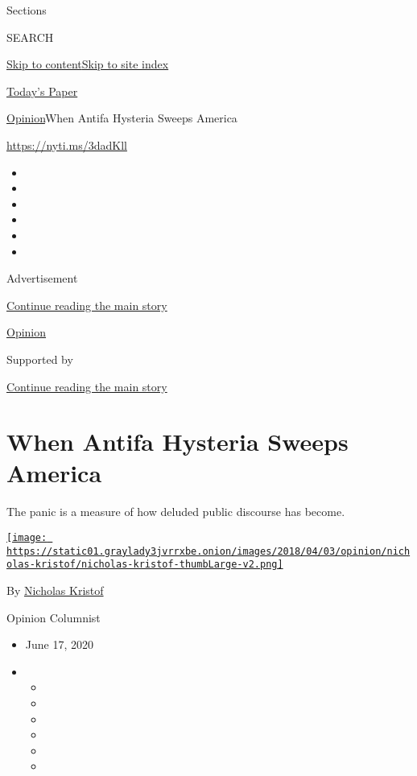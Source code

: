 Sections

SEARCH

\protect\hyperlink{site-content}{Skip to
content}\protect\hyperlink{site-index}{Skip to site index}

\href{https://myaccount.nytimes3xbfgragh.onion/auth/login?response_type=cookie\&client_id=vi}{}

\href{https://www.nytimes3xbfgragh.onion/section/todayspaper}{Today's
Paper}

\href{/section/opinion}{Opinion}\textbar{}When Antifa Hysteria Sweeps
America

\url{https://nyti.ms/3dadKll}

\begin{itemize}
\item
\item
\item
\item
\item
\item
\end{itemize}

Advertisement

\protect\hyperlink{after-top}{Continue reading the main story}

\href{/section/opinion}{Opinion}

Supported by

\protect\hyperlink{after-sponsor}{Continue reading the main story}

\hypertarget{when-antifa-hysteria-sweeps-america}{%
\section{When Antifa Hysteria Sweeps
America}\label{when-antifa-hysteria-sweeps-america}}

The panic is a measure of how deluded public discourse has become.

\href{https://www.nytimes3xbfgragh.onion/column/nicholas-kristof}{\texttt{[image: https://static01.graylady3jvrrxbe.onion/images/2018/04/03/opinion/nicholas-kristof/nicholas-kristof-thumbLarge-v2.png]}}

By
\href{https://www.nytimes3xbfgragh.onion/column/nicholas-kristof}{Nicholas
Kristof}

Opinion Columnist

\begin{itemize}
\item
  June 17, 2020
\item
  \begin{itemize}
  \item
  \item
  \item
  \item
  \item
  \item
  \end{itemize}
\end{itemize}

